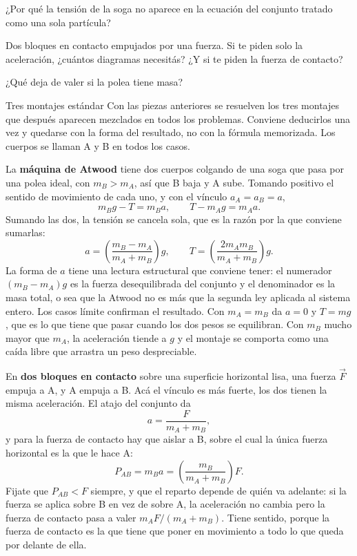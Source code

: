 \documentclass[11pt,openany]{book}
\begin{document}
\begin{chequeo}
\item ¿Por qué la tensión de la soga no aparece en la ecuación del conjunto tratado como una sola partícula?
\item Dos bloques en contacto empujados por una fuerza. Si te piden solo la aceleración, ¿cuántos diagramas necesitás? ¿Y si te piden la fuerza de contacto?
\item ¿Qué deja de valer si la polea tiene masa?
\end{chequeo}

\begin{bloque}{Tres montajes estándar}
Con las piezas anteriores se resuelven los tres montajes que después aparecen mezclados en todos los problemas. Conviene deducirlos una vez y quedarse con la forma del resultado, no con la fórmula memorizada. Los cuerpos se llaman A y B en todos los casos.

La \textbf{máquina de Atwood} tiene dos cuerpos colgando de una soga que pasa por una polea ideal, con $m_B > m_A$, así que B baja y A sube. Tomando positivo el sentido de movimiento de cada uno, y con el vínculo $a_A = a_B = a$,
\[
m_B g - T = m_B a ,
\qquad
T - m_A g = m_A a .
\]
Sumando las dos, la tensión se cancela sola, que es la razón por la que conviene sumarlas:
\[
a = \left(\frac{m_B - m_A}{m_A + m_B}\right) g ,
\qquad
T = \left(\frac{2 m_A m_B}{m_A + m_B}\right) g .
\]
La forma de $a$ tiene una lectura estructural que conviene tener: el numerador $(m_B - m_A)g$ es la fuerza desequilibrada del conjunto y el denominador es la masa total, o sea que la Atwood no es más que la segunda ley aplicada al sistema entero. Los casos límite confirman el resultado. Con $m_A = m_B$ da $a = 0$ y $T = m g$, que es lo que tiene que pasar cuando los dos pesos se equilibran. Con $m_B$ mucho mayor que $m_A$, la aceleración tiende a $g$ y el montaje se comporta como una caída libre que arrastra un peso despreciable.

En \textbf{dos bloques en contacto} sobre una superficie horizontal lisa, una fuerza $\vec F$ empuja a A, y A empuja a B. Acá el vínculo es más fuerte, los dos tienen la misma aceleración. El atajo del conjunto da
\[
a = \frac{F}{m_A + m_B} ,
\]
y para la fuerza de contacto hay que aislar a B, sobre el cual la única fuerza horizontal es la que le hace A:
\[
P_{AB} = m_B a = \left(\frac{m_B}{m_A + m_B}\right) F .
\]
Fijate que $P_{AB} < F$ siempre, y que el reparto depende de quién va adelante: si la fuerza se aplica sobre B en vez de sobre A, la aceleración no cambia pero la fuerza de contacto pasa a valer $m_A F/(m_A+m_B)$. Tiene sentido, porque la fuerza de contacto es la que tiene que poner en movimiento a todo lo que queda por delante de ella.


\end{bloque}
\end{document}
